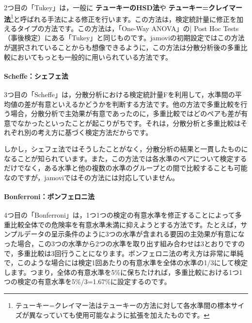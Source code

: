 \documentclass[
  12pt,
  a5jpaper,
  lualatex, ja=standard]{bxjsbook}
\renewcommand{\emph}[1]{\textbf{\color{emph} #1}}
\begin{document}
2つ目の「Tukey」は，一般に\emph{テューキーのHSD法}や\emph{テューキー=クレイマー法}\footnote{テューキー=クレイマー法はテューキーの方法に対して各水準間の標本サイズが異なっていても使用可能なように拡張を加えたものです。}と呼ばれる手法による修正を行います。この方法は，検定統計量に修正を加えるタイプの方法です。この方法は，「One-Way ANOVA」の\colorbox{bar}{\textcolor{gmoji2}{| Post Hoc Tests}}（事後検定）にある「Tukey」と同じものです。jamoviの初期設定ではこの方法が選択されていることからも想像できるように，この方法は分散分析後の多重比較においてもっとも一般的に用いられている方法です。

\hypertarget{scheffeux30b7ux30a7ux30d5ux30a7ux6cd5}{%
\paragraph*{Scheffe：シェフェ法}\label{scheffeux30b7ux30a7ux30d5ux30a7ux6cd5}}

3つ目の「Scheffe」は，分散分析における検定統計量Fを利用して，水準間の平均値の差が有意といえるかどうかを判断する方法です。他の方法で多重比較を行う場合，分散分析で主効果が有意であったのに，多重比較ではどのペアも差が有意でなかったといったことが起こりがちです。それは，分散分析と多重比較はそれぞれ別の考え方に基づく検定方法だからです。

しかし，シェフェ法ではそうしたことがなく，分散分析の結果と一貫したものになることが知られています。また，この方法では各水準のペアについて検定するだけでなく，ある水準と他の複数の水準のグループとの間で比較することも可能なのですが，jamoviではその方法には対応していません。

\hypertarget{subsub:ANOVA-anova-posthoc-bonferroni}{%
\paragraph*{Bonferroni：ボンフェロニ法}\label{subsub:ANOVA-anova-posthoc-bonferroni}}

4つ目の「Bonferroni」は，1つ1つの検定の有意水準を修正することによって多重比較全体での危険率を有意水準未満に抑えようとする方法です。たとえば，サンプルデータの呈示条件のように3つの水準が含まれる要因の主効果が有意になった場合，この3つの水準から2つの水準を取り出す組み合わせは3とおりですので，多重比較は3回行うことになります。ボンフェロニ法の考え方は非常に単純で，このような場合には検定1回あたりの有意水準を全体の水準の1/3にして検定します。つまり，全体の有意水準を5\%に保ちたければ，多重比較における1つ1つの検定の有意水準を5\%/3=1.67\%に設定するのです。
\end{document}
